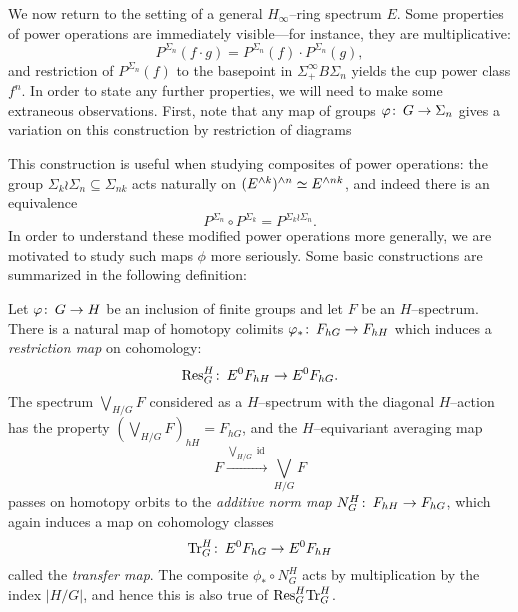 We now return to the setting of a general \(H_\infty\)--ring spectrum \(E\).  Some properties of power operations are immediately visible---for instance, they are multiplicative: \[P^{\Sigma_n}(f \cdot g) = P^{\Sigma_n}(f) \cdot P^{\Sigma_n}(g),\] and restriction of \(P^{\Sigma_n}(f)\) to the basepoint in \(\Sigma^\infty_+ B\Sigma_n\) yields the cup power class \(f^n\).  In order to state any further properties, we will need to make some extraneous observations.  First, note that any map of groups \(\varphi\colon\thinspace G \to \Sigma_n\) gives a variation on this construction by restriction of diagrams
\begin{center}
\end{center}
This construction is useful when studying composites of power operations: the group \(\Sigma_k \wr \Sigma_n \subseteq \Sigma_{nk}\) acts naturally on \((E^{\wedge k})^{\wedge n} \simeq E^{\wedge nk}\), and indeed there is an equivalence \[P^{\Sigma_n} \circ P^{\Sigma_k} = P^{\Sigma_k \wr \Sigma_n}.\]  In order to understand these modified power operations more generally, we are motivated to study such maps \(\phi\) more seriously.  Some basic constructions are summarized in the following definition:
\begin{definition}
Let \(\varphi\colon\thinspace G \to H\) be an inclusion of finite groups and let \(F\) be an \(H\)--spectrum.  There is a natural map of homotopy colimits \(\varphi_*\colon\thinspace F_{hG} \to F_{hH}\) which induces a \textit{restriction map} on cohomology: \[\mathrm{Res}_G^H\colon\thinspace E^0 F_{hH} \to E^0 F_{hG}.\]  The spectrum \(\bigvee_{H/G} F\) considered as a \(H\)--spectrum with the diagonal \(H\)--action has the property \((\bigvee_{H/G} F)_{hH} = F_{hG}\), and the \(H\)--equivariant averaging map \[F \xrightarrow{\bigvee_{H/G} \operatorname{id}} \bigvee_{H/G} F\] passes on homotopy orbits to the \textit{additive norm map} \(N_G^H\colon\thinspace F_{hH} \to F_{hG}\), which again induces a map on cohomology classes \[\mathrm{Tr}_G^H\colon\thinspace E^0 F_{hG} \to E^0 F_{hH}\] called the \textit{transfer map}.  The composite \(\phi_* \circ N_G^H\) acts by multiplication by the index \(|H/G|\), and hence this is also true of \(\mathrm{Res}^H_G \mathrm{Tr}^H_G\).
\end{definition}


